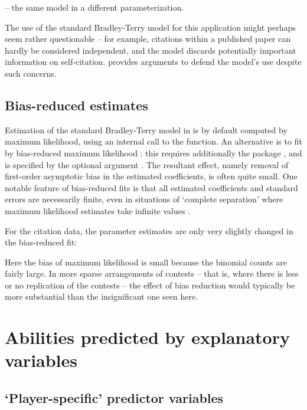 \Rcodeplaceholder{}

-- the same model in a different parameterization.

The use of the standard Bradley-Terry model for this application might perhaps
seem rather questionable -- for example, citations within a published paper can
hardly be considered independent, and the model discards potentially important
information on self-citation.  \citet{stig:94} provides arguments to defend the
model's use despite such concerns.

\subsection{Bias-reduced estimates}

Estimation of the standard Bradley-Terry model in  is by default
computed by maximum likelihood, using an internal call to the
 function.  An alternative  is to fit by bias-reduced
maximum likelihood \citep{firt:93}: this requires additionally the
package \citep{kosm:07}, and is specified by the optional argument .  The
resultant effect, namely removal of first-order asymptotic bias in
the estimated coefficients, is often quite small.  One notable feature of
bias-reduced fits is that all estimated coefficients and standard errors are
necessarily finite, even in situations of `complete separation' where maximum
likelihood estimates take
infinite values \citep{hein:sche:02}.

For the citation data, the parameter estimates are only very
slightly changed in the bias-reduced fit:

\Rcodeplaceholder{}

Here the bias of maximum likelihood is small because the binomial
counts are fairly large.  In more sparse arrangements of contests -- that is,
where there is less
or no replication of the contests -- the effect of bias reduction would
typically be more substantial than the insignificant one seen here.

\section{Abilities predicted by explanatory variables}
\label{sec:covariates}

\subsection{`Player-specific' predictor variables}


